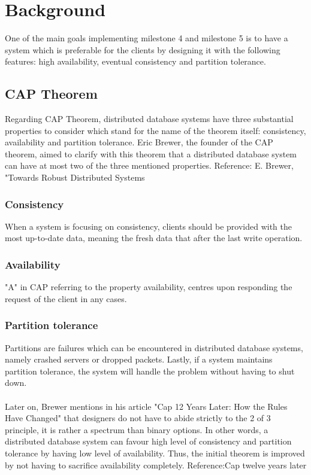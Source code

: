 \section{Background}
\label{sec:background}
One of the main goals implementing milestone 4 and milestone 5 is to have a system which is preferable for the clients by designing it with the following features: high availability, eventual consistency and partition tolerance.

\subsection{CAP Theorem}
\label{sec:backgorund_cap}
Regarding CAP Theorem, distributed database systems have three substantial properties to consider which stand for the name of the theorem itself: consistency, availability and partition tolerance. Eric Brewer, the founder of the CAP theorem, aimed to clarify with this theorem that a distributed database system can have at most two of the three mentioned properties. Reference: E. Brewer, "Towards Robust Distributed Systems

\subsubsection{Consistency}
\label{sec:backgorund_cap_consistency}
When a system is focusing on consistency, clients should be provided with the most up-to-date data, meaning the fresh data that after the last write operation.

\subsubsection{Availability}
\label{sec:backgorund_cap_avaiability}
"A" in CAP referring to the property availability, centres upon responding the request of the client in any cases.

\subsubsection{Partition tolerance}
\label{sec:backgorund_cap_partitiontolarence}
Partitions are failures which can be encountered in distributed database systems, namely crashed servers or dropped packets. Lastly, if a system maintains partition tolerance, the system will handle the problem without having to shut down.\\
\\
Later on, Brewer mentions in his article "Cap 12 Years Later: How the Rules Have Changed" that designers do not have to abide strictly to the 2 of 3 principle, it is rather a spectrum than binary options. In other words, a distributed database system can favour high level of consistency and partition tolerance by having low level of availability. Thus, the initial theorem is improved by not having to sacrifice availability completely. Reference:Cap twelve years later


